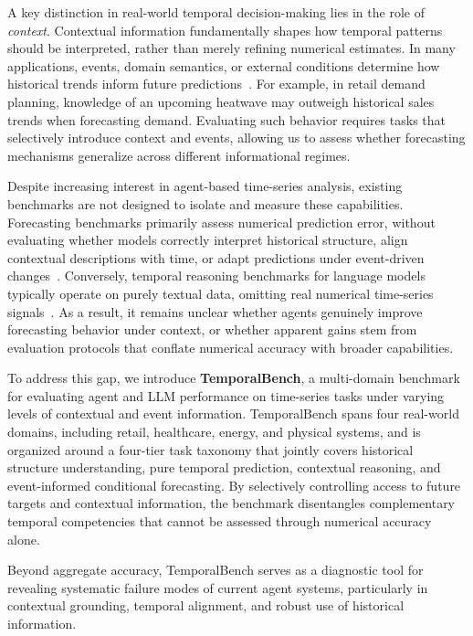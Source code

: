 A key distinction in real-world temporal decision-making lies in the role of \emph{context}. 
Contextual information fundamentally shapes how temporal patterns should be interpreted, rather than merely refining numerical estimates. 
In many applications, events, domain semantics, or external conditions determine how historical trends inform future predictions~\cite{williams2024context, wang2024news}. 
For example, in retail demand planning, knowledge of an upcoming heatwave may outweigh historical sales trends when forecasting demand. 
Evaluating such behavior requires tasks that selectively introduce context and events, allowing us to assess whether forecasting mechanisms generalize across different informational regimes.

Despite increasing interest in agent-based time-series analysis, existing benchmarks are not designed to isolate and measure these capabilities. 
Forecasting benchmarks primarily assess numerical prediction error, without evaluating whether models correctly interpret historical structure, align contextual descriptions with time, or adapt predictions under event-driven changes~\cite{qiu2024tfb, aksu2024gifteval}. 
Conversely, temporal reasoning benchmarks for language models typically operate on purely textual data, omitting real numerical time-series signals~\cite{ning2020torque, fatemi2024test, wang2024tram}. 
As a result, it remains unclear whether agents genuinely improve forecasting behavior under context, or whether apparent gains stem from evaluation protocols that conflate numerical accuracy with broader capabilities.

To address this gap, we introduce \textbf{TemporalBench}, a multi-domain benchmark for evaluating agent and LLM performance on time-series tasks under varying levels of contextual and event information. 
TemporalBench spans four real-world domains, including retail, healthcare, energy, and physical systems, and is organized around a four-tier task taxonomy that jointly covers historical structure understanding, pure temporal prediction, contextual reasoning, and event-informed conditional forecasting. 
By selectively controlling access to future targets and contextual information, the benchmark disentangles complementary temporal competencies that cannot be assessed through numerical accuracy alone.

Beyond aggregate accuracy, TemporalBench serves as a diagnostic tool for revealing systematic failure modes of current agent systems, particularly in contextual grounding, temporal alignment, and robust use of historical information.

